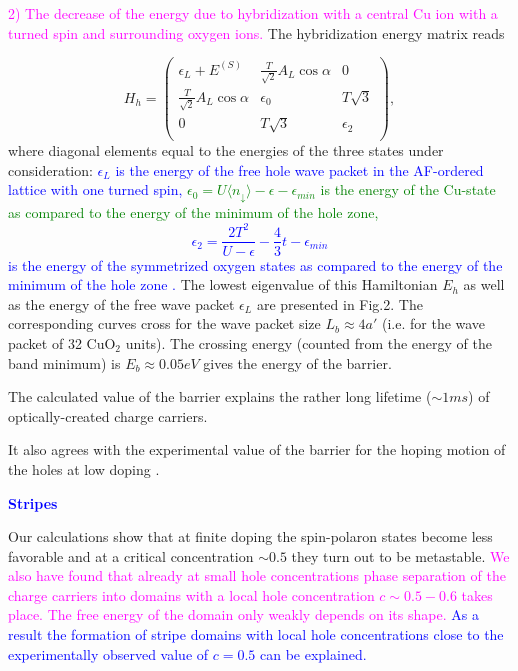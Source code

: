 \documentclass{article}
\begin{document}
\begin{Huge}
{{\noindent
\textcolor{magenta}{
2) The decrease of the energy due to
hybridization with a central Cu ion with a turned spin
and surrounding oxygen ions.}
The hybridization energy matrix reads

\[
H_h = \left (
\begin{array}{ccc}
\epsilon_L+E^{(S)} & \frac{T}{\sqrt{2}}A_L \cos \alpha & 0 \\
\frac{T}{\sqrt{2}}A_L \cos \alpha & \epsilon_0 & T \sqrt{3} \\
0 & T \sqrt{3} & \epsilon_2 \\
\end{array} \nonumber
\right ) ,
\]
where diagonal elements equal to the energies of the three states
under consideration: \textcolor{blue}{ $\epsilon _L$
is the energy of the free hole wave packet in the AF-ordered
lattice with one turned spin,} \textcolor{green}{$\epsilon _0 = U \langle n
_{\downarrow} \rangle- \epsilon - \epsilon_{min} $
is the energy of the Cu-state as compared to the energy of the minimum of
the hole zone,}
\textcolor{blue}{
$$\epsilon _2 = \frac {2T^2} {U-\epsilon} - \frac 4 3 t
- \epsilon_{min} $$ is the energy of the symmetrized
oxygen states as compared to the energy
of the minimum of the hole zone}
\textcolor{red}{\cite{schneider}}\textcolor{blue}{.}
The lowest eigenvalue of this Hamiltonian
$E_h$ as well as the energy
of the free wave packet $\epsilon_L$ are
presented in Fig.2. The corresponding curves cross for
the wave packet size $L_b \approx 4a \prime$ (i.e. for the wave packet of
32 CuO$_2$ units). The crossing energy (counted from the energy
of the band minimum) is $E_b \approx 0.05 eV$ gives the energy
of the barrier.}

\noindent
The calculated value of the barrier
explains the rather long lifetime ($ \sim 1ms$)
of optically-created charge carriers.

\noindent
It also agrees with the experimental value
of the barrier for the hoping motion of the holes at
low doping \textcolor{red}{\cite{kremer}}.



\begin{center}
\textcolor{blue}{
\bf{Stripes}}
\end{center}

\vspace{5mm}
\noindent
Our calculations show that at finite doping the spin-polaron states
become less favorable and  at
a critical concentration $\sim 0.5$ they turn out to be metastable.
\textcolor{magenta}{
We also have found that already at small hole
concentrations phase separation of the charge carriers into domains
with a local hole concentration $c\sim 0.5 - 0.6$ takes place.
The free energy of the
domain only weakly depends on its shape.}
\textcolor{blue}{ As a result the formation of
stripe domains with local hole concentrations close to the experimentally
observed value of $c = 0.5$ can be explained.}






}
\end{Huge}
\end{document}
